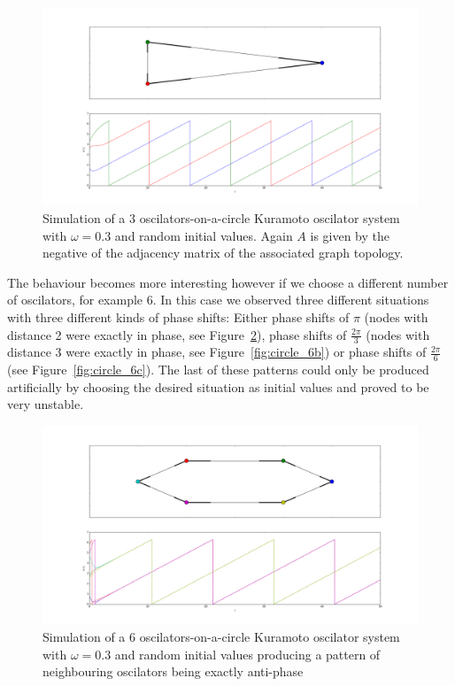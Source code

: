 \begin{figure}[h]
  \centering
  \includegraphics[width=\textwidth]{imgs/circle_3}
  \caption{Simulation of a 3 oscilators-on-a-circle Kuramoto oscilator system with $\omega = 0.3$ and random initial values. Again $A$ is given by the negative of the adjacency matrix of the associated graph topology. }
  \label{fig:circle_3}
\end{figure}

The behaviour becomes more interesting however if we choose a different number of oscilators, for example $6$. In this case we observed three different situations with three different kinds of phase shifts: Either phase shifts of $\pi$ (nodes with distance 2 were exactly in phase, see Figure~\ref{fig:circle_6a}), phase shifts of $\frac{2 \pi}{3}$ (nodes with distance 3 were exactly in phase, see Figure~\ref{fig:circle_6b}) or phase shifts of $\frac{2 \pi}{6}$ (see Figure~\ref{fig:circle_6c}). The last of these patterns could only be produced artificially by choosing the desired situation as initial values and proved to be very unstable. 

\begin{figure}[h]
  \centering
  \includegraphics[width=\textwidth]{imgs/circle_6a}
  \caption{Simulation of a 6 oscilators-on-a-circle Kuramoto oscilator system with $\omega = 0.3$ and random initial values producing a pattern of neighbouring oscilators being exactly anti-phase}
  \label{fig:circle_6a}
\end{figure}

